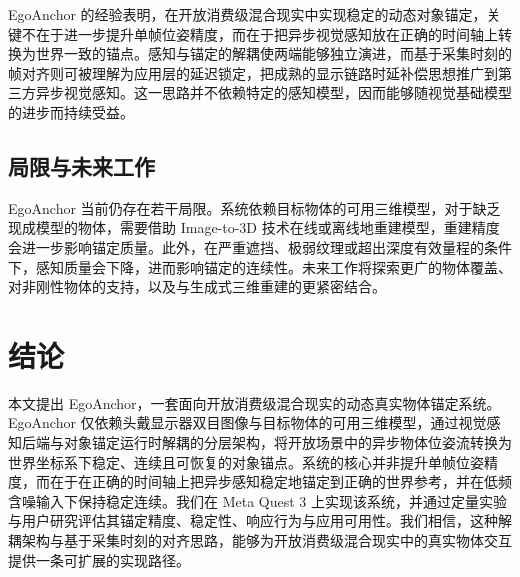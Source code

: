 \documentclass[review]{vgtc}
\begin{document}
EgoAnchor 的经验表明，在开放消费级混合现实中实现稳定的动态对象锚定，关键不在于进一步提升单帧位姿精度，而在于把异步视觉感知放在正确的时间轴上转换为世界一致的锚点。感知与锚定的解耦使两端能够独立演进，而基于采集时刻的帧对齐则可被理解为应用层的延迟锁定，把成熟的显示链路时延补偿思想推广到第三方异步视觉感知。这一思路并不依赖特定的感知模型，因而能够随视觉基础模型的进步而持续受益。

\subsection{局限与未来工作}


EgoAnchor 当前仍存在若干局限。系统依赖目标物体的可用三维模型，对于缺乏现成模型的物体，需要借助 Image-to-3D 技术在线或离线地重建模型，重建精度会进一步影响锚定质量。此外，在严重遮挡、极弱纹理或超出深度有效量程的条件下，感知质量会下降，进而影响锚定的连续性。未来工作将探索更广的物体覆盖、对非刚性物体的支持，以及与生成式三维重建的更紧密结合。

\section{结论}\label{sec:conclusion}


本文提出 EgoAnchor，一套面向开放消费级混合现实的动态真实物体锚定系统。EgoAnchor 仅依赖头戴显示器双目图像与目标物体的可用三维模型，通过视觉感知后端与对象锚定运行时解耦的分层架构，将开放场景中的异步物体位姿流转换为世界坐标系下稳定、连续且可恢复的对象锚点。系统的核心并非提升单帧位姿精度，而在于在正确的时间轴上把异步感知稳定地锚定到正确的世界参考，并在低频含噪输入下保持稳定连续。我们在 Meta Quest 3 上实现该系统，并通过定量实验与用户研究评估其锚定精度、稳定性、响应行为与应用可用性。我们相信，这种解耦架构与基于采集时刻的对齐思路，能够为开放消费级混合现实中的真实物体交互提供一条可扩展的实现路径。
\end{document}
